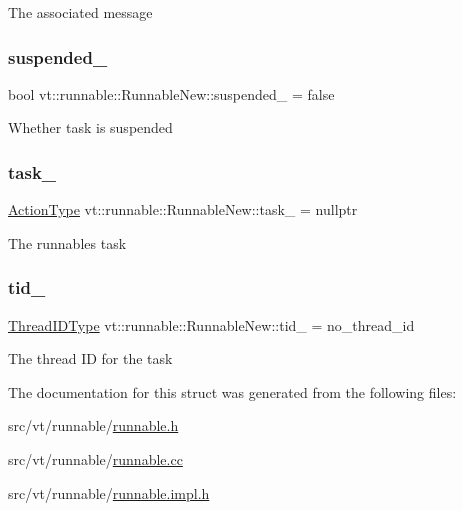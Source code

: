 The associated message \mbox{\label{structvt_1_1runnable_1_1_runnable_new_a1b20f584aa7a1a09857029532fda1782}} 
\subsubsection{\texorpdfstring{suspended\+\_\+}{suspended\_}}
{\footnotesize\ttfamily bool vt\+::runnable\+::\+Runnable\+New\+::suspended\+\_\+ = false\hspace{0.3cm}{\ttfamily [private]}}

Whether task is suspended \mbox{\label{structvt_1_1runnable_1_1_runnable_new_a8216711b400b7c1f36c5a9bafaa7133e}} 
\subsubsection{\texorpdfstring{task\+\_\+}{task\_}}
{\footnotesize\ttfamily \hyperlink{namespacevt_ae0a5a7b18cc99d7b732cb4d44f46b0f3}{Action\+Type} vt\+::runnable\+::\+Runnable\+New\+::task\+\_\+ = nullptr\hspace{0.3cm}{\ttfamily [private]}}

The runnable\textquotesingle{}s task \mbox{\label{structvt_1_1runnable_1_1_runnable_new_ad0e857fdce2f1c13512a1415993cd7fe}} 
\subsubsection{\texorpdfstring{tid\+\_\+}{tid\_}}
{\footnotesize\ttfamily \hyperlink{namespacevt_a9b887d814dd25ff495a0c8270304ac02}{Thread\+I\+D\+Type} vt\+::runnable\+::\+Runnable\+New\+::tid\+\_\+ = no\+\_\+thread\+\_\+id\hspace{0.3cm}{\ttfamily [private]}}

The thread ID for the task 

The documentation for this struct was generated from the following files\+:\begin{DoxyCompactItemize}
\item 
src/vt/runnable/\hyperlink{runnable_8h}{runnable.\+h}\item 
src/vt/runnable/\hyperlink{runnable_8cc}{runnable.\+cc}\item 
src/vt/runnable/\hyperlink{runnable_8impl_8h}{runnable.\+impl.\+h}\end{DoxyCompactItemize}
